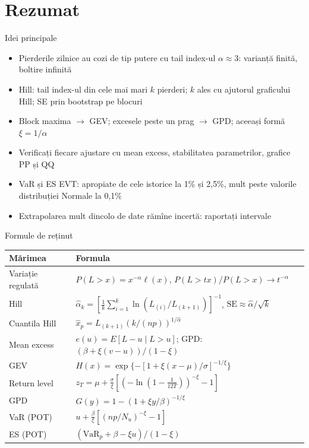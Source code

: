 \section{Rezumat}

\begin{frame}{Idei principale}
\itemsize{\small}
\begin{itemize}
    \item Pierderile zilnice au cozi de tip putere cu tail index-ul $\alpha \approx 3$: varianță finită, boltire infinită
    \item Hill: tail index-ul din cele mai mari $k$ pierderi; $k$ ales cu ajutorul graficului Hill; SE prin bootstrap pe blocuri
    \item Block maxima $\to$ GEV; excesele peste un prag $\to$ GPD; aceeași formă $\xi = 1/\alpha$
    \item Verificați fiecare ajustare cu mean excess, stabilitatea parametrilor, grafice PP și QQ
    \item VaR și ES EVT: apropiate de cele istorice la 1\% și 2,5\%, mult peste valorile distribuției Normale la 0,1\%
    \item Extrapolarea mult dincolo de date rămîne incertă: raportați intervale
\end{itemize}
\end{frame}

\begin{frame}{Formule de reținut}
\itemsize{\small}
{\renewcommand{\arraystretch}{1.45}\begin{center}
\footnotesize
\begin{tabular}{ll}
\toprule
\textbf{Mărimea} & \textbf{Formula} \\
\midrule
Variație regulată & $P(L > x) = x^{-\alpha}\ell(x)$, \quad $P(L > tx)/P(L > x) \to t^{-\alpha}$ \\
Hill & $\hat\alpha_k = [\frac1k\sum_{i=1}^k \ln(L_{(i)}/L_{(k+1)})]^{-1}$, \quad $\mathrm{SE} \approx \hat\alpha/\sqrt{k}$ \\
Cuantila Hill & $\hat x_p = L_{(k+1)}(k/(np))^{1/\hat\alpha}$ \\
Mean excess & $e(u) = E[L - u \mid L > u]$; \quad GPD: $(\beta + \xi(v - u))/(1 - \xi)$ \\
GEV & $H(x) = \exp\{-[1 + \xi(x - \mu)/\sigma]^{-1/\xi}\}$ \\
Return level & $z_T = \mu + \frac{\sigma}{\xi}[(-\ln(1 - \frac{1}{12T}))^{-\xi} - 1]$ \\
GPD & $G(y) = 1 - (1 + \xi y/\beta)^{-1/\xi}$ \\
VaR (POT) & $u + \frac{\beta}{\xi}[(np/N_u)^{-\xi} - 1]$ \\
ES (POT) & $(\mathrm{VaR}_p + \beta - \xi u)/(1 - \xi)$ \\
\bottomrule
\end{tabular}
\end{center}
}
\end{frame}

